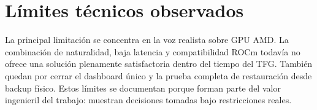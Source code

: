 \section{Límites técnicos observados}
La principal limitación se concentra en la voz realista sobre GPU AMD. La combinación de naturalidad, baja latencia y compatibilidad ROCm todavía no ofrece una solución plenamente satisfactoria dentro del tiempo del TFG. También quedan por cerrar el dashboard único y la prueba completa de restauración desde backup físico. Estos límites se documentan porque forman parte del valor ingenieril del trabajo: muestran decisiones tomadas bajo restricciones reales.
